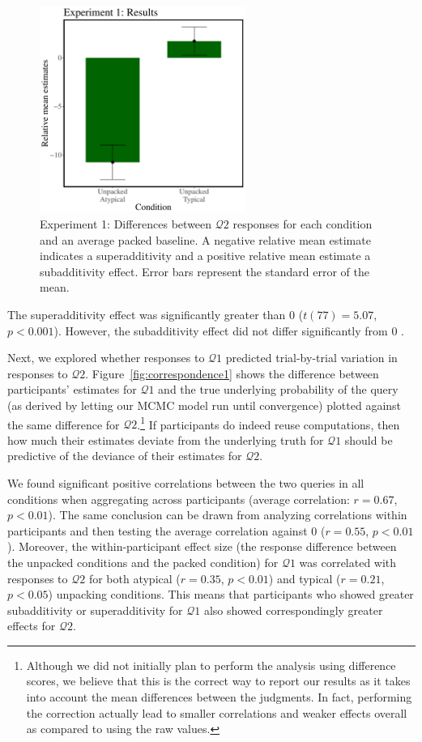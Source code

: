 \begin{figure}
\centering
\includegraphics[width=0.6\textwidth]{figures/amo1results.pdf}
\caption{Experiment 1: Differences between $\mathcal{Q}2$ responses for each condition and an average packed baseline. A negative relative mean estimate indicates a superadditivity and a positive relative mean estimate a subadditivity effect. Error bars represent the standard error of the mean.}
\label{fig:meandiffs1}
\end{figure}

The superadditivity effect was significantly greater than 0 ($t(77)=5.07$, $p<0.001$). However, the subadditivity effect did not differ significantly from 0 \citep[$t(77)=-0.42$, $p>0.6$; see also][]{dasgupta17}.

Next, we explored whether responses to $\mathcal{Q}1$ predicted trial-by-trial variation in responses to $\mathcal{Q}2$. Figure~\ref{fig:correspondence1} shows the difference between participants' estimates for $\mathcal{Q}1$ and the true underlying probability of the query (as derived by letting our MCMC model run until convergence) plotted against the same difference for $\mathcal{Q}2$.\footnote{Although we did not initially plan to perform the analysis using difference scores, we believe that this is the correct way to report our results as it takes into account the mean differences between the judgments. In fact, performing the correction actually lead to smaller correlations and weaker effects overall as compared to using the raw values.} If participants do indeed reuse computations, then how much their estimates deviate from the underlying truth for $\mathcal{Q}1$ should be predictive of the deviance of their estimates for $\mathcal{Q}2$.

We found significant positive correlations between the two queries in all conditions when aggregating across participants (average correlation: $r=0.67$, $p<0.01$). The same conclusion can be drawn from analyzing correlations within participants and then testing the average correlation against 0 ($r=0.55$, $p<0.01$). Moreover, the within-participant effect size (the response difference between the unpacked conditions and the packed condition) for $\mathcal{Q}1$ was correlated with responses to $\mathcal{Q}2$ for both atypical ($r=0.35$, $p<0.01$) and typical ($r=0.21$, $p<0.05$) unpacking conditions. This means that participants who showed greater subadditivity or superadditivity for $\mathcal{Q}1$ also showed correspondingly greater effects for $\mathcal{Q}2$.

